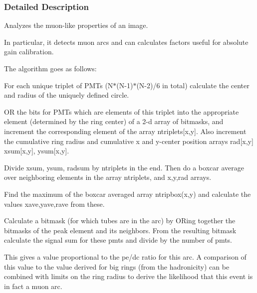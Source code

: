 \subsubsection{Detailed Description}
Analyzes the muon-\/like properties of an image. 

In particular, it detects muon arcs and can calculates factors useful for absolute gain calibration.

The algorithm goes as follows:


\begin{DoxyItemize}
\item For each unique triplet of PMTs (N$\ast$(N-\/1)$\ast$(N-\/2)/6 in total) calculate the center and radius of the uniquely defined circle.
\end{DoxyItemize}


\begin{DoxyItemize}
\item OR the bits for PMTs which are elements of this triplet into the appropriate element (determined by the ring center) of a 2-\/d array of bitmasks, and increment the corresponding element of the array ntriplets\mbox{[}x,y\mbox{]}. Also increment the cumulative ring radius and cumulative x and y-\/center position arrays rad\mbox{[}x,y\mbox{]} xsum\mbox{[}x,y\mbox{]}, ysum\mbox{[}x,y\mbox{]}.
\end{DoxyItemize}


\begin{DoxyItemize}
\item Divide xsum, ysum, radsum by ntriplets in the end. Then do a boxcar average over neighboring elements in the array ntriplets, and x,y,rad arrays.
\end{DoxyItemize}


\begin{DoxyItemize}
\item Find the maximum of the boxcar averaged array ntripbox(x,y) and calculate the values xave,yave,rave from these.
\end{DoxyItemize}


\begin{DoxyItemize}
\item Calculate a bitmask (for which tubes are in the arc) by ORing together the bitmasks of the peak element and its neighbors. From the resulting bitmask calculate the signal sum for these pmts and divide by the number of pmts.
\end{DoxyItemize}

This gives a value proportional to the pe/dc ratio for this arc. A comparison of this value to the value derived for big rings (from the hadronicity) can be combined with limits on the ring radius to derive the likelihood that this event is in fact a muon arc. 

